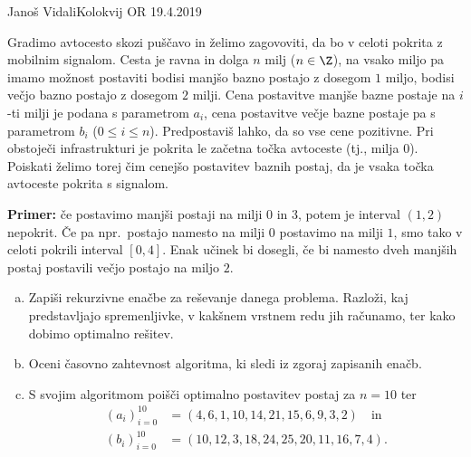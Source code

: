 \begin{naloga}{Janoš Vidali}{Kolokvij OR 19.4.2019}
\begin{vprasanje}
Gradimo avtocesto skozi puščavo in želimo zagovoviti,
da bo v celoti pokrita z mobilnim signalom.
Cesta je ravna in dolga $n$ milj ($n \in \Z$),
na vsako miljo pa imamo možnost postaviti
bodisi manjšo bazno postajo z dosegom $1$ miljo,
bodisi večjo bazno postajo z dosegom $2$ milji.
Cena postavitve manjše bazne postaje na $i$-ti milji
je podana s parametrom $a_i$,
cena postavitve večje bazne postaje pa s parametrom $b_i$ ($0 \le i \le n$).
Predpostaviš lahko, da so vse cene pozitivne.
Pri obstoječi infrastrukturi je pokrita le začetna točka avtoceste
(tj., milja $0$).
Poiskati želimo torej čim cenejšo postavitev baznih postaj,
da je vsaka točka avtoceste pokrita s signalom.

\medskip
\noindent
{\bf Primer:} če postavimo manjši postaji na milji $0$ in $3$,
potem je interval $(1, 2)$ nepokrit.
Če pa npr.~postajo namesto na milji $0$ postavimo na milji $1$,
smo tako v celoti pokrili interval $[0, 4]$.
Enak učinek bi dosegli,
če bi namesto dveh manjših postaj postavili večjo postajo na miljo $2$.

\begin{enumerate}[(a)]
\item Zapiši rekurzivne enačbe za reševanje danega problema.
Razloži, kaj pred\-stav\-lja\-jo spremenljivke,
v kakšnem vrstnem redu jih računamo,
ter kako dobimo optimalno rešitev.

\item Oceni časovno zahtevnost algoritma, ki sledi iz zgoraj zapisanih enačb.

\item S svojim algoritmom poišči optimalno postavitev postaj za $n = 10$ ter
\begin{align*}
(a_i)_{i=0}^{10} &= (4,  6,  1, 10, 14, 21, 15,  6,  9,  3,  2)
\quad \text{in} \\
(b_i)_{i=0}^{10} &= (10, 12, 3, 18, 24, 25, 20, 11, 16,  7,  4) .
\end{align*}
\end{enumerate}
\end{vprasanje}


\end{naloga}
